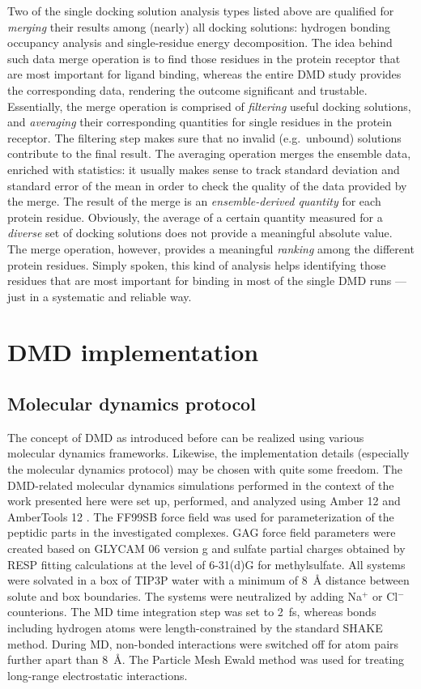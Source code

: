 Two of the single docking solution analysis types listed above are qualified for
\textit{merging} their results among (nearly) all docking solutions: hydrogen
bonding occupancy analysis and single-residue energy decomposition. The idea
behind such data merge operation is to find those residues in the protein
receptor that are most important for ligand binding, whereas the entire DMD
study provides the corresponding data, rendering the outcome significant and
trustable. Essentially, the merge operation is comprised of \textit{filtering}
useful docking solutions, and \textit{averaging} their corresponding quantities
for single residues in the protein receptor. The filtering step makes sure that
no invalid (e.g.\ unbound) solutions contribute to the final result. The
averaging operation merges the ensemble data, enriched with statistics: it
usually makes sense to track standard deviation and standard error of the mean
in order to check the quality of the data provided by the merge. The result of
the merge is an \textit{ensemble-derived quantity} for each protein residue.
Obviously, the average of a certain quantity measured for a \textit{diverse} set
of docking solutions does not provide a meaningful absolute value. The merge
operation, however, provides a meaningful \textit{ranking} among the different
protein residues. Simply spoken, this kind of analysis helps identifying those
residues that are most important for binding in most of the single DMD runs ---
just in a systematic and reliable way.


\section{DMD implementation}

\subsection{Molecular dynamics protocol}

The concept of DMD as introduced before can be realized using various molecular
dynamics frameworks. Likewise, the implementation details (especially the
molecular dynamics protocol) may be chosen with quite some freedom. The
DMD-related molecular dynamics simulations performed in the context of the work
presented here were set up, performed, and analyzed using Amber 12 and
AmberTools 12 \cite{case_amber_11}. The FF99SB force field was used for
parameterization of the peptidic parts in the investigated complexes. GAG force
field parameters were created based on GLYCAM 06 version g
\cite{kirschner_glycam06:_2008} and sulfate partial charges obtained by RESP
fitting calculations at the level of 6-31(d)G for methylsulfate. All systems
were solvated in a box of TIP3P water with a minimum of \SI{8}{\angstrom}
distance between solute and box boundaries. The systems were neutralized by
adding Na$^{+}$ or Cl$^{-}$ counterions. The MD time integration step was set to
\SI{2}{\femto\second}, whereas bonds including hydrogen atoms were
length-constrained by the standard SHAKE method. During MD, non-bonded
interactions were switched off for atom pairs further apart than
\SI{8}{\angstrom}. The Particle Mesh Ewald method was used for treating
long-range electrostatic interactions.

